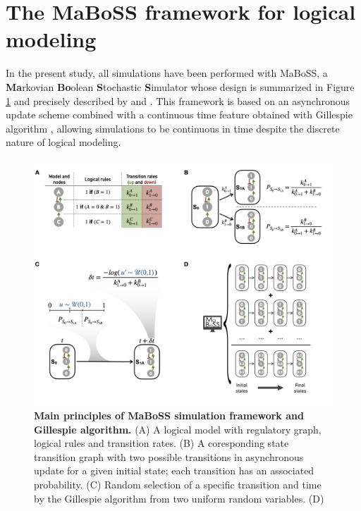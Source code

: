 \documentclass[a4paper,12pt,twoside,onecolumn,openright,final,oldfontcommands]{memoir}
\begin{document}
\section{The MaBoSS framework for logical
modeling}\label{maboss-section}

In the present study, all simulations have been performed with MaBoSS, a
\textbf{Ma}rkovian \textbf{Bo}olean \textbf{S}tochastic
\textbf{S}imulator whose design is summarized in Figure \ref{fig:maboss}
and precisely described by \citet{stoll_continuous_2012} and
\citet{stoll_maboss_2017}. This framework is based on an asynchronous
update scheme combined with a continuous time feature obtained with
Gillespie algorithm \citep{gillespie_general_1976}, allowing simulations
to be continuous in time despite the discrete nature of logical
modeling.

\begin{figure}

{\centering \includegraphics[width=0.9\linewidth]{fig/maboss} 

}

\caption[Main principles of MaBoSS simulation framework and Gillespie algorithm]{\textbf{Main principles of MaBoSS simulation
framework and Gillespie algorithm.} (A) A logical model with regulatory
graph, logical rules and transition rates. (B) A coresponding state
transition graph with two possible transitions in asynchronous update
for a given initial state; each transition has an associated
probability. (C) Random selection of a specific transition and time by
the Gillespie algorithm from two uniform random variables. (D)}\label{fig:maboss}
\end{figure}
\end{document}

